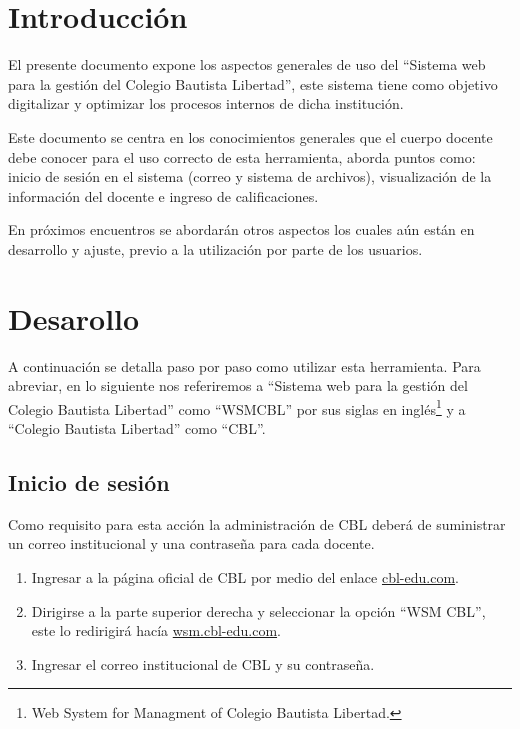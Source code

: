 \documentclass[12pt]{article}
\begin{document}
    

    \section{Introducción}

    El presente documento expone los aspectos generales de uso del ``Sistema web para la gestión del Colegio Bautista Libertad'',
    este sistema tiene como objetivo digitalizar y optimizar los procesos internos de dicha institución.

    Este documento se centra en los conocimientos generales que el cuerpo docente debe conocer para el uso correcto de esta herramienta, 
    aborda puntos como: inicio de sesión en el sistema (correo y sistema de archivos), visualización de la información del docente e
    ingreso de calificaciones.

    En próximos encuentros se abordarán otros aspectos los cuales aún están en desarrollo y ajuste, previo a la utilización por parte de los usuarios.

    \section{Desarollo}
    
    A continuación se detalla paso por paso como utilizar esta herramienta.
    Para abreviar, en lo siguiente nos referiremos a ``Sistema web para la gestión del Colegio Bautista Libertad''
    como ``WSMCBL'' por sus siglas en inglés\footnote{Web System for Managment of Colegio Bautista Libertad.} y
    a ``Colegio Bautista Libertad'' como ``CBL''.
    
    \subsection{Inicio de sesión}

    Como requisito para esta acción la administración de CBL deberá de suministrar un correo institucional y una contraseña para cada docente.

    \begin{enumerate}
        \item Ingresar a la página oficial de CBL por medio del enlace \href{www.cbl-edu.com}{cbl-edu.com}.
        \item Dirigirse a la parte superior derecha y seleccionar la opción ``WSM CBL'', este lo redirigirá hacía \href{wsm.cbl-edu.com}{wsm.cbl-edu.com}.
        \item Ingresar el correo institucional de CBL y su contraseña.
    \end{enumerate}
\end{document}
